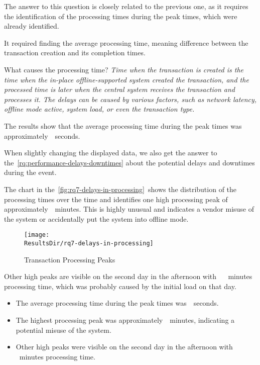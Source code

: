 The answer to this question is closely related to the previous one, as it requires the identification of the processing times during the peak times, which were already identified.

It required finding the average processing time, meaning difference between the transaction creation and its completion times.

\begin{info-box}{What causes the processing time?}
	\textit{
		Time when the transaction is created is the time when the in-place offline-supported system created the transaction, and the processed time is later when the central system receives the transaction and processes it.
		The delays can be caused by various factors, such as network latency, offline mode active, system load, or even the transaction type.
	}
\end{info-box}

The results show that the average processing time during the peak times was approximately~~seconds.

When slightly changing the displayed data, we also get the answer to the~\autoref{rq:performance-delays-downtimes} about the potential delays and downtimes during the event.

\begin{rqbox}
	\textit{}
\end{rqbox}

The chart in the~\autoref{fig:rq7-delays-in-processing}~shows the distribution of the processing times over the time and identifies one high processing peak of approximately~~minutes.
This is highly unusual and indicates a vendor misuse of the system or accidentally put the system into offline mode.

\begin{figure}[H]
	\centering
	\texttt{[image: \\ResultsDir/rq7-delays-in-processing]}
	\caption{Transaction Processing Peaks}
	\label{fig:rq7-delays-in-processing}
	\source
\end{figure}

Other high peaks are visible on the second day in the afternoon with ~ ~minutes processing time, which was probably caused by the initial load on that day.

\begin{keytakeaways}
	\begin{itemize}
		\item The average processing time during the peak times was~~seconds.
		\item The highest processing peak was approximately~~minutes, indicating a potential misuse of the system.
		\item Other high peaks were visible on the second day in the afternoon with ~ ~minutes processing time.
	\end{itemize}
\end{keytakeaways}

